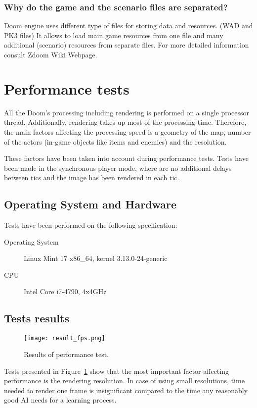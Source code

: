 \subsubsection{Why do the game and the scenario files are separated?}

Doom engine uses different type of files for storing data and resources. (WAD and PK3 files) It allows to load main game resources from one file and many additional (scenario) resources from separate files. For more detailed information consult Zdoom Wiki Webpage\cite{zdoom-wiki}.

\section{Performance tests}\label{sec:performance}

All the Doom's processing including rendering is performed on a single processor thread. Additionally, rendering takes up most of the processing time. Therefore, the main factors affecting the processing speed is a geometry of the map, number of the actors (in-game objects like items and enemies) and the resolution. 

These factors have been taken into account during performance tests. Tests have been made in the synchronous player mode, where are no additional delays between tics and the image has been rendered in each tic.

	\subsection{Operating System and Hardware}
	
	Tests have been performed on the following specification:
	
	\begin{description}
		\item[Operating System] Linux Mint 17 x86\_64, kernel 3.13.0-24-generic
		\item[CPU] Intel Core i7-4790, 4x4GHz
	\end{description}

\subsection{Tests results}

\begin{figure}
\centering
\texttt{[image: result\_fps.png]}
\caption{Results of performance test.}
\label{fig:fps_test}
\end{figure}

Tests presented in Figure~\ref{fig:fps_test} show that the most important factor affecting performance is the rendering resolution. In case of using small resolutions, time needed to render one frame is insignificant compared to the time any reasonably good AI needs for a learning process.



